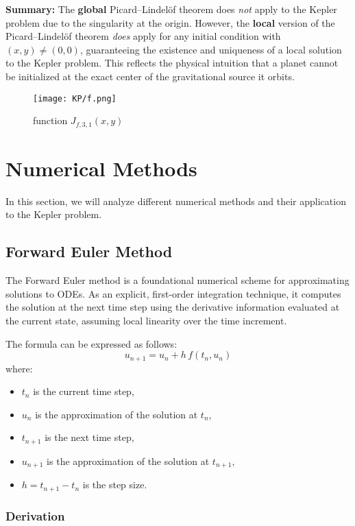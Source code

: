 \documentclass[11pt]{article}
\begin{document}
\medskip

\noindent\textbf{Summary:} The \textbf{global} Picard–Lindelöf theorem does \emph{not} apply to the Kepler problem due to the singularity at the origin. However, the \textbf{local} version of the Picard–Lindelöf theorem \emph{does} apply for any initial condition with \( (x, y) \neq (0,0) \), guaranteeing the existence and uniqueness of a local solution to the Kepler problem. This reflects the physical intuition that a planet cannot be initialized at the exact center of the gravitational source it orbits.


\begin{figure}[H]
  \centering
  \texttt{[image: KP/f.png]}
  \caption{function $J_{f,3,1}(x,y)$}
  \label{fig:three-in-line}
\end{figure}




\clearpage

\section{Numerical Methods}
In this section, we will analyze different numerical methods and their application to the Kepler problem.

\subsection{Forward Euler Method}
The Forward Euler method is a foundational numerical scheme for approximating solutions to ODEs. As an explicit, first-order integration technique, it computes the solution at the next time step using the derivative information evaluated at the current state, assuming local linearity over the time increment. 

The formula can be expressed as follows:
\[
u_{n+1} = u_n + h\,f(t_n, u_n)
\]
where:
\begin{itemize}
    \item $t_n$ is the current time step,
    \item $u_n$ is the approximation of the solution at $t_n$,
    \item $t_{n+1}$ is the next time step,
    \item $u_{n+1}$ is the approximation of the solution at $t_{n+1}$,
    \item $h = t_{n+1} - t_n$ is the step size.
\end{itemize}

\subsubsection{Derivation}
\end{document}
